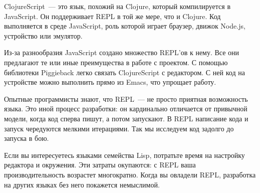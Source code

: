 ClojureScript~--- это язык, похожий на Clojure, который компилируется в JavaScript. Он поддерживает REPL в той же мере, что и Clojure. Код выполняется в среде JavaScript, роль которой играет браузер, движок Node.js, устройство или эмулятор.

Из-за разнообразия JavaScript создано множество REPL'ов к нему. Все они предлагают те или иные преимущества в работе с проектом. С помощью библиотеки Piggieback легко связать ClojureScript с редактором. С ней код на устройстве можно выполнить прямо из Emacs, что упрощает работу.

\begin{framed}

Опытные программисты знают, что REPL~--- не просто приятная возможность языка. Это иной процесс разработки: он кардинально отличается от привычной модели, когда код сперва пишут, а потом запускают. В REPL написание кода и запуск чередуются мелкими итерациями. Так мы исследуем код задолго до запуска в бою.

Если вы интересуетесь языками семейства Lisp, потратьте время на настройку редактора и окружения. Эти затраты окупаются: с REPL ваша производительность возрастет многократно. Когда вы овладели REPL, разработка на других языках без него покажется немыслимой.

\end{framed}
